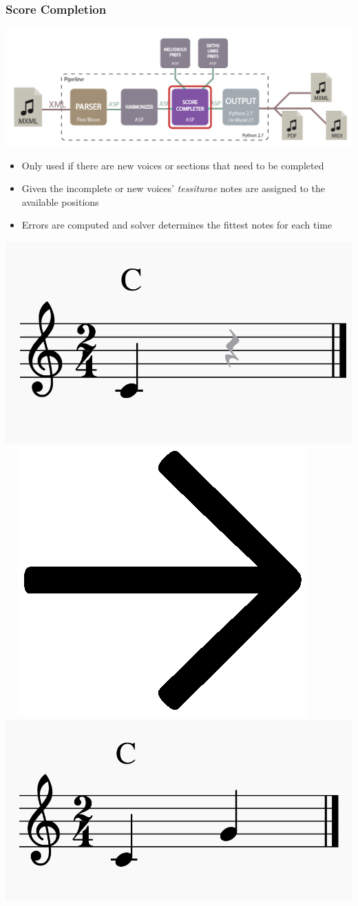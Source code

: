 \documentclass[english,handout]{beamer}
\begin{document}
	\begin{frame}[t,fragile]
	\frametitle{Score Completion}
	\begin{center}
			\includegraphics[width=0.6\linewidth]{imagenes/arch_trans/arquitectura_final_asp_comp-01.png}
			\end{center}
	\begin{itemize}
		\item Only used if there are \alert{new voices or sections} that need to be completed
		\pause
		\item Given the incomplete or new voices' \textit{tessiturae} \alert{notes are assigned} to the available positions
		\pause
		\item \alert{Errors} are computed and solver determines the \alert{fittest notes} for each time
	\end{itemize}
		\begin{center}
				\includegraphics[width=0.25\linewidth,valign=c]{imagenes/incomplete_score.png}~~
				\includegraphics[width=0.04\linewidth,valign=c]{imagenes/arrow.png}~~
				\includegraphics[width=0.25\linewidth,valign=c]{imagenes/completed_score.png}
		\end{center}
	\end{frame}
\end{document}
